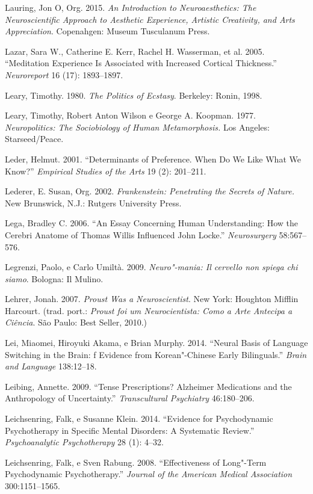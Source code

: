 {\begin{Parskip}
Lauring, Jon O, Org. 2015. \emph{An Introduction to Neuroaesthetics: The
Neuroscientific Approach to Aesthetic Experience, Artistic Creativity,
and Arts Appreciation}. Copenahgen: Museum Tusculanum Press.

Lazar, Sara W., Catherine E. Kerr, Rachel H. Wasserman, et al. 2005.
``Meditation Experience Is Associated with Increased Cortical
Thickness.'' \emph{Neuroreport} 16 (17): 1893--1897.

Leary, Timothy. 1980. \emph{The Politics of Ecstasy}. Berkeley: Ronin,
1998.

Leary, Timothy, Robert Anton Wilson e George A. Koopman. 1977.
\emph{Neuropolitics: The Sociobiology of Human Metamorphosis.} Los
Angeles: Starseed/Peace.

Leder, Helmut. 2001. ``Determinants of Preference. When Do We Like What
We Know?'' \emph{Empirical Studies of the Arts} 19 (2): 201--211.

Lederer, E. Susan, Org. 2002. \emph{Frankenstein: Penetrating the
Secrets of Nature.} New Brunswick, N.J.: Rutgers University Press.

Lega, Bradley C. 2006. ``An Essay Concerning Human Understanding: How
the Cerebri Anatome of Thomas Willis Influenced John Locke.''
\emph{Neurosurgery} 58:567--576.

Legrenzi, Paolo, e Carlo Umiltà. 2009. \emph{Neuro"-mania: Il cervello
non spiega chi siamo}. Bologna: Il Mulino.

Lehrer, Jonah. 2007. \emph{Proust Was a Neuroscientist}. New York:
Houghton Mifflin Harcourt. (trad. port.: \emph{Proust foi um
Neurocientista: Como a Arte Antecipa a Ciência}. São Paulo: Best Seller,
2010.)

Lei, Miaomei, Hiroyuki Akama, e Brian Murphy. 2014. ``Neural Basis of
Language Switching in the Brain: f Evidence from Korean"-Chinese Early
Bilinguals.'' \emph{Brain and Language} 138:12--18.

Leibing, Annette. 2009. ``Tense Prescriptions? Alzheimer Medications and
the Anthropology of Uncertainty.'' \emph{Transcultural Psychiatry}
46:180--206.

Leichsenring, Falk, e Susanne Klein. 2014. ``Evidence for Psychodynamic
Psychotherapy in Specific Mental Disorders: A Systematic Review.''
\emph{Psychoanalytic Psychotherapy} 28 (1): 4--32.

Leichsenring, Falk, e Sven Rabung. 2008. ``Effectiveness of Long"-Term
Psychodynamic Psychotherapy.'' \emph{Journal of the American Medical
Association} 300:1151--1565.


\end{Parskip}}
